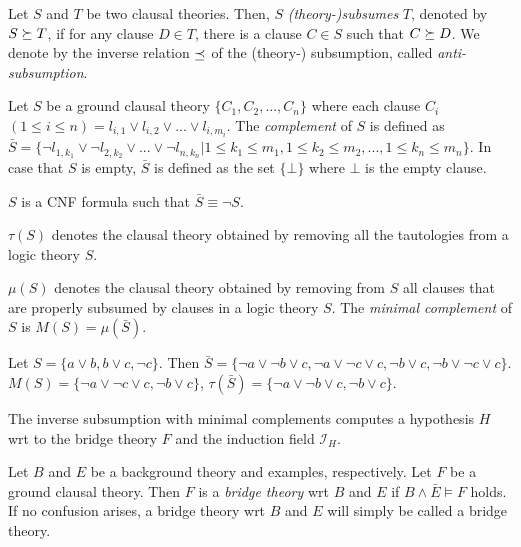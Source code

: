 \begin{defn}\label{definition_theory_subsumption}
Let $S$ and $T$ be two clausal theories. Then, $S$ \emph{(theory-)subsumes} $T$, denoted by $S \succeq T$, if for any clause $D \in T$, there is a clause $C \in S$ such
that $C \succeq D$. We denote by the inverse relation $\preceq$ of the (theory-) subsumption, called \emph{anti-subsumption}.
\end{defn}

\begin{defn}
Let $S$ be a ground clausal theory $\{C_1, C_2,... ,C_n\}$ where each clause $C_i$ $(1 \le i \le n)= l_{i,1} \lor l_{i,2} \lor... \lor l_{i,m_i}$.
The \emph{complement} of $S$ is defined as
\\$\bar{S} = \{\neg l_{1,k_1} \lor \neg l_{2,k_2} \lor... \lor \neg l_{n,k_n} |
1 \le k_1 \le m_1 , 1 \le k_2 \le m_2,..., 1 \le k_n \le m_n\}$.
In case that $S$ is empty, $\bar{S}$ is defined as the set $\{\bot\}$ where $\bot$ is the empty clause.
\end{defn}

\begin{remark}
$S$ is a CNF formula such that $\bar{S} \equiv \neg S$.
\end{remark}

\begin{defn}
\emph{$\tau(S)$} denotes the clausal theory obtained by removing all the tautologies from a logic theory $S$.
\end{defn}

\begin{defn}
\emph{$\mu(S)$} denotes the clausal theory obtained by removing from $S$ all clauses that are properly subsumed by clauses in a logic theory $S$.
The \emph{minimal complement} of $S$ is $M(S)=\mu(\bar{S})$.
\end{defn}

\begin{exmp}
Let $S=\{a \lor b, b \lor c, \neg c\}$. Then
$\bar{S}=\{\neg a \lor \neg b \lor c, \neg a \lor \neg c \lor c, \neg b \lor c, \neg b \lor \neg c \lor c\}$.
$M(S)=\{\neg a \lor \neg c \lor c, \neg b \lor c\}$,
$\tau(\bar{S})=\{\neg a \lor \neg b \lor c, \neg b \lor c\}$.
\end{exmp}

The inverse subsumption with minimal complements computes a hypothesis $H$ wrt to the bridge theory $F$ and the induction field $\mathcal{I}_H$.

\begin{defn}\label{definition_bridge_theory}
Let $B$ and $E$ be a background theory and examples, respectively.
Let $F$ be a ground clausal theory. Then $F$ is a \emph{bridge theory} wrt $B$ and $E$ if
$B \land \bar{E} \models F$ holds. If no confusion arises, a bridge theory wrt $B$ and $E$ will simply be called a bridge theory.
\end{defn}

